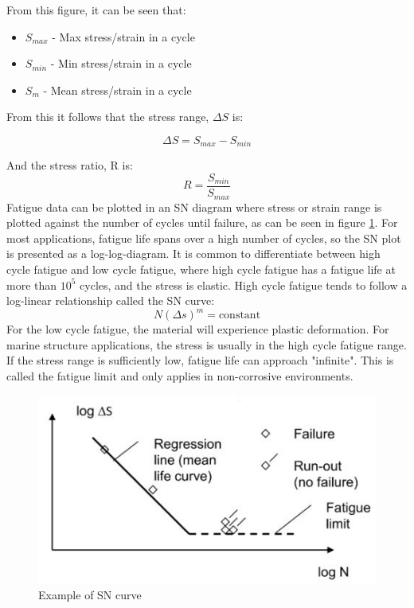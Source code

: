 From this figure, it can be seen that:
\begin{itemize}
    \item $S_{max}$ -  Max stress/strain in a cycle
    \item $S_{min}$ -  Min stress/strain in a cycle
    \item $S_{m}$ - Mean stress/strain in a cycle
\end{itemize}

From this it follows that the stress range, $\Delta S$ is:

\begin{equation}
    \Delta S =S_{max} - S_{min}
\end{equation}

\noindent And the stress ratio, R is:
\begin{equation}
    R=\frac{S_{min}}{S_{max}}
\end{equation}
Fatigue data can be plotted in an SN diagram where stress or strain range is plotted against the number of cycles until failure, as can be seen in figure \ref{fig:sn}. For most applications, fatigue life spans over a high number of cycles, so the SN plot is presented as a log-log-diagram. It is common to differentiate between high cycle fatigue and low cycle fatigue, where high cycle fatigue has a fatigue life at more than $10^5$ cycles, and the stress is elastic. High cycle fatigue tends to follow a log-linear relationship called the SN curve:
\begin{equation}
    N(\Delta s)^m = \text{constant}
\end{equation}
For the low cycle fatigue, the material will experience plastic deformation. For marine structure applications, the stress is usually in the high cycle fatigue range. If the stress range is sufficiently low, fatigue life can approach "infinite". This is called the fatigue limit and only applies in non-corrosive environments. 

\begin{figure}[h!]
\centering
\includegraphics[scale=1]{figures/sn}
\caption[$\; \:$Example of SN curve]{Example of SN curve  \cite{fatigue2016} }
 \label{fig:sn}
\end{figure}

